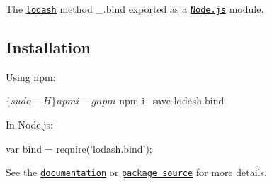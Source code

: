 The \href{https://lodash.com/}{\tt lodash} method {\ttfamily \+\_\+.\+bind} exported as a \href{https://nodejs.org/}{\tt Node.\+js} module.

\subsection*{Installation}

Using npm\+: 
\begin{DoxyCode}
$ \{sudo -H\} npm i -g npm
$ npm i --save lodash.bind
\end{DoxyCode}


In Node.\+js\+: 
\begin{DoxyCode}
var bind = require('lodash.bind');
\end{DoxyCode}


See the \href{https://lodash.com/docs#bind}{\tt documentation} or \href{https://github.com/lodash/lodash/blob/4.2.1-npm-packages/lodash.bind}{\tt package source} for more details. 